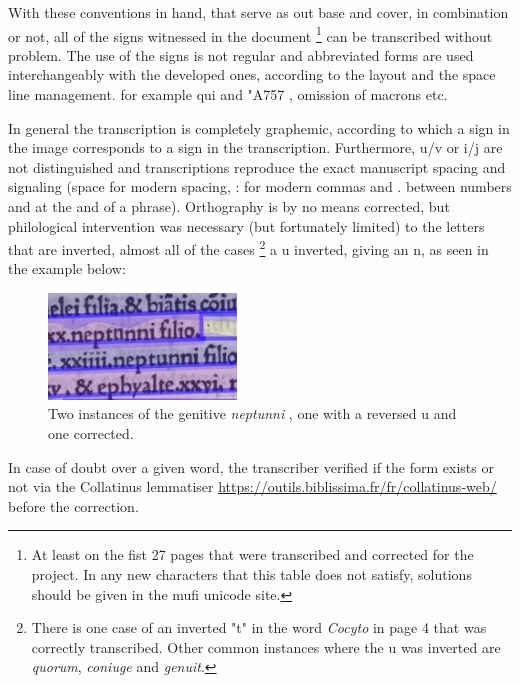 \documentclass[12pt,twoside]{article}
\begin{document}
With these conventions in hand, that serve as out base and cover, in combination or not, all of the signs witnessed in the document \footnote{At least on the fist 27 pages that were transcribed and corrected for the project. In any new characters that this table does not satisfy, solutions should be given in the mufi unicode site.} can be transcribed without problem. The use of the signs is not regular and abbreviated forms are used interchangeably with the developed ones, according to the layout and the space line management. for example qui and \char"A757 , omission of macrons etc.

In general the transcription is completely graphemic, according to which a sign in the image corresponds to a sign in the transcription. Furthermore, u/v or i/j are not distinguished and transcriptions reproduce the exact manuscript spacing and signaling (space for modern spacing, : for modern commas and . between numbers and at the and of a phrase).
Orthography is by no means corrected, but philological intervention was necessary (but fortunately limited) to the letters that are inverted, almost all of the cases \footnote{There is one case of an inverted "t" in the word \textit{Cocyto} in page 4 that was correctly transcribed. Other common instances where the u was inverted are \textit{quorum}, \textit{coniuge} and \textit{genuit}. } a u inverted, giving an n, as seen in the example below:

\begin{figure}[!h]
    \centering
    \includegraphics[width=5cm]{neptunni.jpg}
    \caption{Two instances of the genitive \textit{neptunni} , one with a reversed u and one corrected.}
    \label{fig:SecFigure}
\end{figure}
In case of doubt over a given word, the transcriber verified if the form exists or not via the Collatinus lemmatiser \hyperref[Collatinus]{https://outils.biblissima.fr/fr/collatinus-web/} before the correction.
\end{document}
